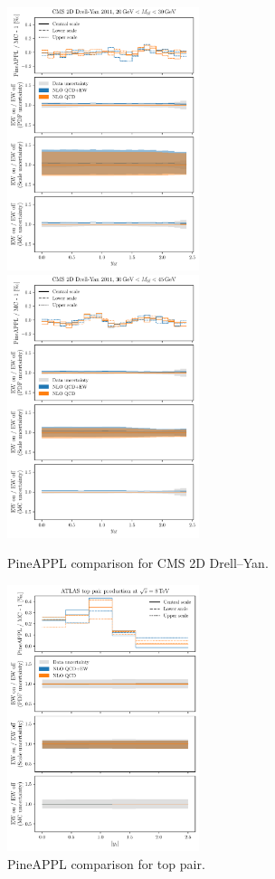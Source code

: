 \begin{figure}
    \centering
    \includegraphics[width=0.5\textwidth]{figures/pineappl_CMSDY2D11_bin1}%
    \includegraphics[width=0.5\textwidth]{figures/pineappl_CMSDY2D11_bin2}
    \caption{PineAPPL comparison for CMS 2D Drell--Yan.}
    \label{fig:cmsdy2d11_bins12}
\end{figure}

\begin{figure}
    \centering
    \includegraphics[width=0.5\textwidth]{figures/pineappl_ATLAS_TTB_DIFF_8TEV_LJ_TRAP}%
    \caption{PineAPPL comparison for top pair.}
    \label{fig:atlastop-rap}
\end{figure}
